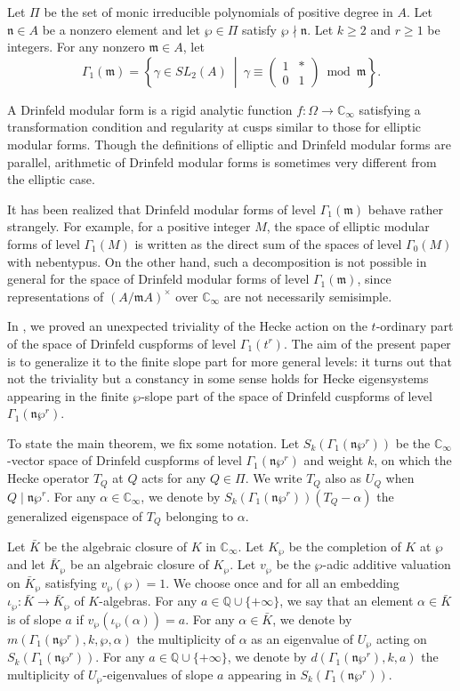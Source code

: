 \documentclass[11pt]{amsart}
\theoremstyle{plain}
\theoremstyle{definition}
\newcommand{\bQ}{\mathbb{Q}}
\newcommand{\frem}{\mathfrak{m}}
\newcommand{\frn}{\mathfrak{n}}
\newcommand{\Cinf}{\mathbb{C}_{\infty}}
\begin{document}
Let $\Pi$ be the set of monic irreducible polynomials of positive degree in $A$. Let $\frn\in A$ be a nonzero element 
and let $\wp\in \Pi$ satisfy $\wp\nmid\frn$. Let $k\geq 2$ and $r\geq 1$ be integers. 
For any nonzero $\frem\in A$, let
\[
\Gamma_1(\frem)=\left\{\gamma\in \mathit{SL}_2(A)\ \middle|\ \gamma\equiv\begin{pmatrix}
	1 & *\\0& 1
\end{pmatrix}\bmod \frem\right\}.
\]

A Drinfeld modular form is a rigid analytic function $f:\Omega\to \Cinf$ satisfying a transformation condition and regularity at cusps similar to those for elliptic modular forms. Though the definitions of elliptic and Drinfeld modular forms are parallel, arithmetic of Drinfeld modular forms is sometimes very different from the elliptic case. 

It has been realized that Drinfeld modular forms of level $\Gamma_1(\frem)$ behave rather strangely. For example, for a positive integer $M$, the space of elliptic 
modular forms of level $\Gamma_1(M)$ is written as the direct sum 
of the spaces of level $\Gamma_0(M)$ with nebentypus. On the other hand, such a 
decomposition is not possible in general for the space of Drinfeld modular forms of level $\Gamma_1(\frem)$, since representations of  $(A/\frem A)^\times$ over $
\Cinf$ are not necessarily semisimple.
    
In \cite{Ha_DMO}, we proved an unexpected triviality of the Hecke action on the $t$-ordinary part of the space of Drinfeld cuspforms of level $\Gamma_1(t^r)$. The 
aim of the present paper is to generalize it to the finite slope part for more general levels: it turns out that not the triviality but a constancy in some sense 
holds 
for Hecke eigensystems appearing in the finite $\wp$-slope part of the space of Drinfeld cuspforms of level $\Gamma_1(\frn\wp^r)$.

To state the main theorem, we fix some notation. Let $S_k(\Gamma_1(\frn\wp^r))$ be the $\Cinf$-vector space of Drinfeld cuspforms of level
$\Gamma_1(\frn\wp^r)$ and weight $k$, on which the Hecke operator $T_Q$ at $Q$ acts for any $Q\in \Pi$. We write $T_Q$ also as $U_Q$ when $Q\mid \frn\wp^r$.
For any $\alpha\in \Cinf$, we denote by $S_k(\Gamma_1(\frn\wp^r))(T_Q-\alpha)$ the generalized eigenspace of $T_Q$ belonging to $\alpha$.

Let $\bar{K}$ be the algebraic closure of $K$ in $\Cinf$. Let $K_\wp$ be the completion of $K$ at $\wp$ and let $\bar{K}_\wp$ be an algebraic
closure of $K_\wp$. Let $v_\wp$ be the $\wp$-adic additive valuation on $\bar{K}_\wp$ satisfying $v_\wp(\wp)=1$.
We choose once and for all an embedding $\iota_\wp: \bar{K}\to \bar{K}_\wp$ of $K$-algebras. 
For any $a\in \bQ\cup\{+\infty\}$, we say that an element $\alpha\in \bar{K}$ is of slope $a$ if
$v_\wp(\iota_\wp(\alpha))=a$. 
For any $\alpha\in \bar{K}$, we denote by $m(\Gamma_1(\frn\wp^r),k,\wp,\alpha)$ the multiplicity of $\alpha$ as an eigenvalue of $U_\wp$ acting on
$S_k(\Gamma_1(\frn\wp^r))$. For any $a\in \bQ\cup\{+\infty\}$,
we denote by $d(\Gamma_1(\frn\wp^r),k,a)$ the multiplicity of $U_\wp$-eigenvalues of slope $a$ appearing in $S_k(\Gamma_1(\frn\wp^r))$. 
\end{document}
